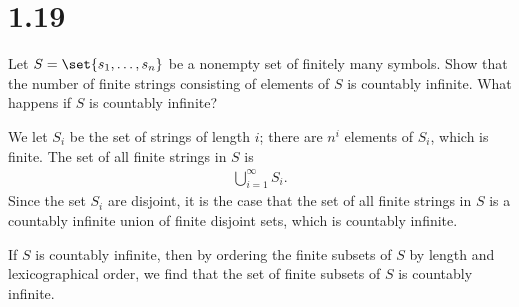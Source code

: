 \documentclass[12pt]{mypackage}
\begin{document}
\section{1.19}%
\begin{problem}
  Let $S = \set{s_1,\dots,s_n}$ be a nonempty set of finitely many symbols. Show that the number of finite strings consisting of elements of $S$ is countably infinite. What happens if $S$ is countably infinite?
\end{problem}
\begin{solution}
  We let $S_i$ be the set of strings of length $i$; there are $n^i$ elements of $S_i$, which is finite. The set of all finite strings in $S$ is
  \begin{align*}
    \bigcup_{i=1}^{\infty}S_i.
  \end{align*}
  Since the set $S_i$ are disjoint, it is the case that the set of all finite strings in $S$ is a countably infinite union of finite disjoint sets, which is countably infinite.\newline

  If $S$ is countably infinite, then by ordering the finite subsets of $S$ by length and lexicographical order, we find that the set of finite subsets of $S$ is countably infinite.
\end{solution}
\end{document}
